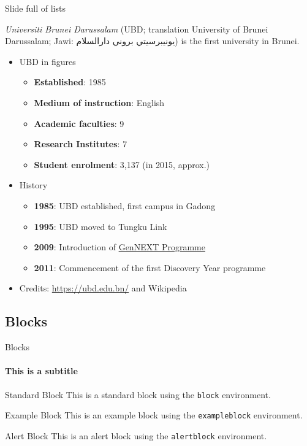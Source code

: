 \documentclass[]{beamer}
\begin{document}
\begin{frame}{Slide full of lists}

	\textit{Universiti Brunei Darussalam} (UBD; translation University of Brunei Darussalam; Jawi: \textarabic{يونيبرسيتي بروني دارالسلام}) is the first university in Brunei.

	\begin{itemize}
		\item UBD in figures
			\begin{itemize}
				\item \textbf{Established}: 1985
				\item \textbf{Medium of instruction}: English
				\item \textbf{Academic faculties}: 9
				\item \textbf{Research Institutes}: 7
				\item \textbf{Student enrolment}: 3,137 (in 2015, approx.)
			\end{itemize}
		\item History
			\begin{itemize}
				\item \textbf{1985}: UBD established, first campus in Gadong
				\item \textbf{1995}: UBD moved to Tungku Link
				\item \textbf{2009}: Introduction of \href{https://ubd.edu.bn/admission/undergraduate/gennext-degree-programme/}{GenNEXT Programme}
				\item \textbf{2011}: Commencement of the first Discovery Year programme			
			\end{itemize}
		\item Credits: \url{https://ubd.edu.bn/} and Wikipedia
	\end{itemize}
\end{frame}

\subsection{Blocks}

\begin{frame}{Blocks}
\framesubtitle{This is a subtitle}

	\begin{block}{Standard Block}
		This is a standard block using the \texttt{block} environment.
	\end{block}
	
	\begin{exampleblock}{Example Block}
		This is an example block using the \texttt{exampleblock} environment.
	\end{exampleblock}
	
	\begin{alertblock}{Alert Block}
		This is an alert block using the \texttt{alertblock} environment.
	\end{alertblock}
	
\end{frame}
\end{document}
